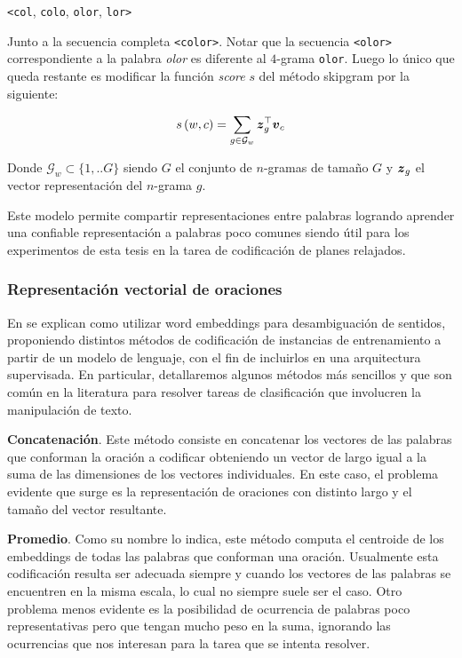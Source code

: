 \begin{center}
    \verb|<col|, \verb|colo|, \verb|olor|, \verb|lor>|
\end{center}

Junto a la secuencia completa \verb|<color>|. Notar que la secuencia
\verb|<olor>| correspondiente a la palabra \emph{olor} es diferente al $4$-grama
\verb|olor|. Luego lo único que queda restante es modificar la función
\emph{score} $s$ del método skipgram por la siguiente:

\begin{equation}
    s\left(w, c\right) = \sum_{g \in \mathcal{G}_w} \boldsymbol{z}_g^{\top}\boldsymbol{v}_c
\end{equation}

Donde $\mathcal{G}_w \subset \{1, .. G\}$ siendo $G$ el conjunto de $n$-gramas
de tamaño $G$ y $\boldsymbol{z}_g$ el vector representación del $n$-grama $g$.

Este modelo permite compartir representaciones entre palabras logrando aprender
una confiable representación a palabras poco comunes siendo útil para los
experimentos de esta tesis en la tarea de codificación de planes relajados.

\subsubsection{Representación vectorial de oraciones}

En \citep{Iacobacci-2016} se explican como utilizar word embeddings para
desambiguación de sentidos, proponiendo distintos métodos de codificación de
instancias de entrenamiento a partir de un modelo de lenguaje, con el fin
de incluirlos en una arquitectura supervisada. En particular, detallaremos
algunos métodos más sencillos y que son común en la literatura para resolver
tareas de clasificación que involucren la manipulación de texto.

\textbf{Concatenación}. Este método consiste en concatenar los vectores de las
palabras que conforman la oración a codificar obteniendo un vector de largo
igual a la suma de las dimensiones de los vectores individuales. En este caso,
el problema evidente que surge es la representación de oraciones con distinto
largo y el tamaño del vector resultante.

\textbf{Promedio}. Como su nombre lo indica, este método computa el centroide de
los embeddings de todas las palabras que conforman una oración. Usualmente esta
codificación resulta ser adecuada siempre y cuando los vectores de las palabras
se encuentren en la misma escala, lo cual no siempre suele ser el caso. Otro
problema menos evidente es la posibilidad de ocurrencia de palabras poco
representativas pero que tengan mucho peso en la suma, ignorando las ocurrencias
que nos interesan para la tarea que se intenta resolver.

